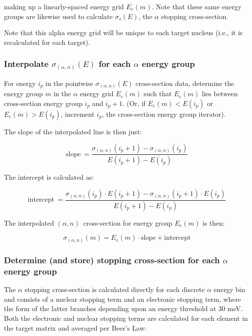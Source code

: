 \documentclass[10pt]{article}
\newcommand{\alphn}[0]{$\left(\alpha,n\right)$}
\newcommand{\sigan}[0]{\sigma_{\left(\alpha,n\right)}}
\begin{document}
making up a linearly-spaced energy grid $E_e\left(m\right)$. Note that these same energy groups are likewise used to calculate $\sigma_{s}\left(E\right)$, the $\alpha$ stopping cross-section. 

Note that this alpha energy grid will be unique to each target nucleus (i.e., it is recalculated for each target).

\subsubsection{Interpolate $\sigan\left(E\right)$ for each $\alpha$ energy group}

For energy $i_p$ in the pointwise $\sigan\left(E\right)$ cross-section data, determine the energy group $m$ in the $\alpha$ energy grid $E_e\left(m\right)$ such that $E_e\left(m\right)$ lies between cross-section energy group $i_p$ and $i_p+1$. (Or, if $E_e\left(m\right) < E\left(i_p\right)$ or $E_e\left(m\right) > E\left(i_p\right)$, increment $i_p$, the cross-section energy group iterator). 

The slope of the interpolated line is then just:

\begin{equation}
\mathrm{slope}\ = \frac{ \sigan\left(i_p+1\right) - \sigan\left(i_p\right) }{ E\left(i_p+1\right) - E\left(i_p\right) }
\end{equation}

The intercept is calculated as:

\begin{equation}
\mathrm{intercept}\ = \frac{ \sigan\left(i_p \right) \cdot E\left(i_p+1\right) - \sigan\left(i_p+1\right) \cdot E\left(i_p\right) } { E\left(i_p+1\right) - E\left(i_p\right)}
\end{equation}

The interpolated \alphn\ cross-section for energy group $E_e\left(m\right)$ is then:

\begin{equation}
\sigan\left(m\right) = E_e\left(m\right) \cdot \mathrm{slope} + \mathrm{intercept}
\end{equation}

\subsubsection{Determine (and store) stopping cross-section for each $\alpha$ energy group}

The $\alpha$ stopping cross-section is calculated directly for each discrete $\alpha$ energy bin and consists of a nuclear stopping term and an electronic stopping term, where the form of the latter branches depending upon an energy threshold at 30 meV. Both the electronic and nuclear stopping terms are calculated for each element in the target matrix and averaged per Beer's Law:
\end{document}
